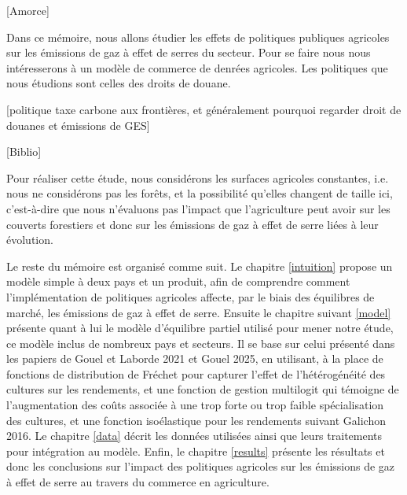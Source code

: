 [Amorce]

Dans ce mémoire, nous allons étudier les effets de politiques publiques agricoles sur les émissions de gaz à effet de serres du secteur. Pour se faire nous nous intéresserons à un modèle de commerce de denrées agricoles. Les politiques que nous étudions sont celles des droits de douane.

    [politique taxe carbone aux frontières, et généralement pourquoi regarder droit de douanes et émissions de GES]

    [Biblio]


Pour réaliser cette étude, nous considérons les surfaces agricoles constantes, i.e. nous ne considérons pas les forêts, et la possibilité qu’elles changent de taille ici, c’est-à-dire que nous n’évaluons pas l’impact que l’agriculture peut avoir sur les couverts forestiers et donc sur les émissions de gaz à effet de serre liées à leur évolution.

Le reste du mémoire est organisé comme suit. Le chapitre \ref{intuition} propose un modèle simple à deux pays et un produit, afin de comprendre comment l’implémentation de politiques agricoles affecte, par le biais des équilibres de marché, les émissions de gaz à effet de serre. Ensuite le chapitre suivant \ref{model} présente quant à lui le modèle d’équilibre partiel utilisé pour mener notre étude, ce modèle inclus de nombreux pays et secteurs. Il se base sur celui présenté dans les papiers de Gouel et Laborde 2021 et Gouel 2025, en utilisant, à la place de fonctions de distribution de Fréchet pour capturer l’effet de l’hétérogénéité des cultures sur les rendements, et une fonction de gestion multilogit qui témoigne de l’augmentation des coûts associée à une trop forte ou trop faible spécialisation des cultures, et une fonction isoélastique pour les rendements suivant Galichon 2016. Le chapitre \ref{data} décrit les données utilisées ainsi que leurs traitements pour intégration au modèle. Enfin, le chapitre \ref{results} présente les résultats et donc les conclusions sur l’impact des politiques agricoles sur les émissions de gaz à effet de serre au travers du commerce en agriculture.
